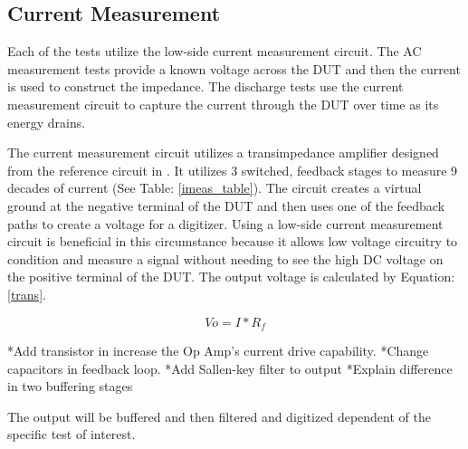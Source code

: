 \subsection{Current Measurement}

Each of the tests utilize the low-side current measurement circuit. The AC measurement tests provide a known voltage across the DUT and then the current is used to construct the impedance. The discharge tests use the current measurement circuit to capture the current through the DUT over time as its energy drains. 



The current measurement circuit utilizes a transimpedance amplifier designed from the reference circuit in \cite{steve_thesis}. It utilizes 3 switched, feedback stages to measure 9 decades of current (See Table: \ref{imeas_table}). The circuit creates a virtual ground at the negative terminal of the DUT and then uses one of the feedback paths to create a voltage for a digitizer. Using a low-side current measurement circuit is beneficial in this circumstance because it allows low voltage circuitry to condition and measure a signal without needing to see the high DC voltage on the positive terminal of the DUT. The output voltage is calculated by Equation: \eqref{trans}.

\begin{equation}
\label{trans}
Vo = I*R_f
\end{equation}

*Add transistor in increase the Op Amp's current drive capability.
*Change capacitors in feedback loop.
*Add Sallen-key filter to output
*Explain difference in two buffering stages


The output will be buffered and then filtered and digitized dependent of the specific test of interest.

